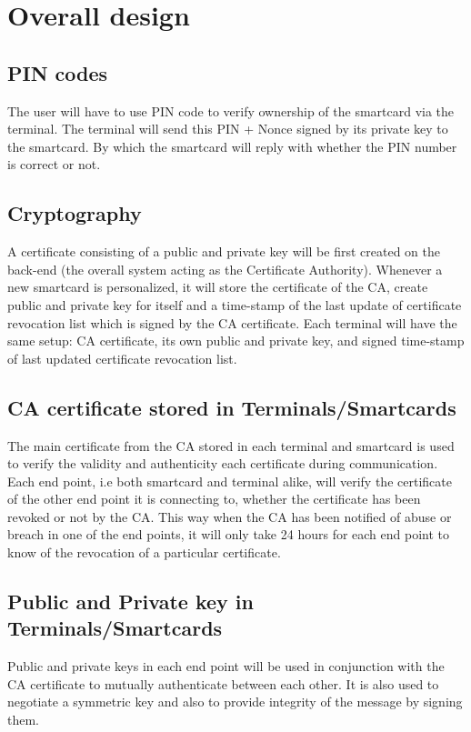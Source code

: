 \section*{Overall design}
\subsection{PIN codes}
The user will have to use PIN code to verify ownership of the smartcard via the terminal. The terminal will send this PIN + Nonce signed by its private key to the smartcard. By which the smartcard will reply with whether the PIN number is correct or not.

\subsection{Cryptography}
A certificate consisting of a public and private key will be first created on the back-end (the overall system acting as the Certificate Authority). Whenever a new smartcard is personalized, it will store the certificate of the CA, create public and private key for itself and a time-stamp of the last update of certificate revocation list which is signed by the CA certificate. Each terminal will have the same setup: CA certificate, its own public and private key, and signed time-stamp of last updated certificate revocation list.

\subsection{CA certificate stored in Terminals/Smartcards}
The main certificate from the CA stored in each terminal and smartcard is used to verify the validity and authenticity each certificate during communication. Each end point, i.e both smartcard and terminal alike, will verify the certificate of the other end point it is connecting to, whether the certificate has been revoked or not by the CA. This way when the CA has been notified of abuse or breach in one of the end points, it will only take 24 hours for each end point to know of the revocation of a particular certificate.

\subsection{Public and Private key in Terminals/Smartcards}
Public and private keys in each end point will be used in conjunction with the CA certificate to mutually authenticate between each other. It is also used to negotiate a symmetric key and also to provide integrity of the message by signing them.

